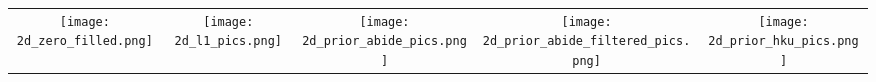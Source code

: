 
\begin{tabular}{c @{\hskip 0pt} c @{\hskip 0pt} c @{\hskip 0pt} c @{\hskip 0pt} c }
    \texttt{[image: 2d\_zero\_filled.png]}&
    \texttt{[image: 2d\_l1\_pics.png]}&
    \texttt{[image: 2d\_prior\_abide\_pics.png]}&
    \texttt{[image: 2d\_prior\_abide\_filtered\_pics.png]}&
    \texttt{[image: 2d\_prior\_hku\_pics.png]}
   \end{tabular}